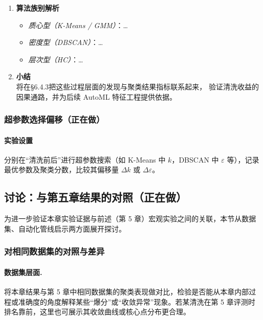 \documentclass[10pt]{article} %
\numberwithin{equation}{section}
\begin{document}
\begin{enumerate}[label=(\alph*)]
\item \textbf{算法族别解析}\\
\begin{itemize}
  \item \emph{质心型（K-Means / GMM）}：\quad \dots
  \item \emph{密度型（DBSCAN）}：\quad \dots
  \item \emph{层次型（HC）}：\quad \dots
\end{itemize}

\item \textbf{小结}\\
将在§6.4.3把这些过程层面的发现与聚类结果指标联系起来，
验证清洗收益的因果通路，并为后续 AutoML 特征工程提供依据。
\end{enumerate}



\subsubsection{超参数选择偏移（正在做）}
\label{subsec:param_shift}

\paragraph{实验设置}
分别在“清洗前后”进行超参数搜索（如 K-Means 中 $k$，DBSCAN 中 $\varepsilon$ 等），记录最优参数及聚类分数，比较其偏移量 \(\Delta k\) 或 \(\Delta \varepsilon\)。

\subsection{讨论：与第五章结果的对照（正在做）}
\label{sec:discussion}

为进一步验证本章实验证据与前述（第 5 章）宏观实验之间的关联，本节从数据集、自动化管线启示两方面展开探讨。

\subsubsection{对相同数据集的对照与差异}
\label{subsec:discussion_data}

\paragraph{数据集层面.}
将本章结果与第 5 章中相同数据集的聚类表现做对比，检验是否能从本章内部过程或准确度的角度解释某些“爆分”或“收敛异常”现象。若某清洗在第 5 章评测时排名靠前，这里也可展示其收敛曲线或核心点分布更合理。
\end{document}
